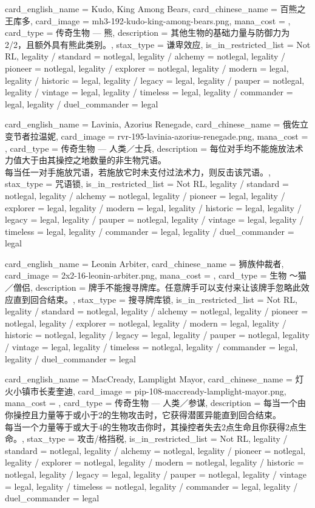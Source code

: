 \documentclass[lang = cn, color = black, 10pt]{AllThatStax}
\begin{document}
\card
{
	card_english_name = {Kudo, King Among Bears},
	card_chinese_name = {百熊之王库多},
	card_image = mh3-192-kudo-king-among-bears.png,
	mana_cost = ,
	card_type = 传奇生物 — 熊,
	description = {其他生物的基础力量与防御力为2/2，且额外具有熊此类别。},
	stax_type = 谦卑效应,
	is_in_restricted_list = Not RL,
	legality / standard = notlegal,
	legality / alchemy = notlegal,
	legality / pioneer = notlegal,
	legality / explorer = notlegal,
	legality / modern = legal,
	legality / historic = legal,
	legality / legacy = legal,
	legality / pauper = notlegal,
	legality / vintage = legal,
	legality / timeless = legal,
	legality / commander = legal,
	legality / duel_commander = legal
}

\card
{
	card_english_name = {Lavinia, Azorius Renegade},
	card_chinese_name = {俄佐立变节者拉温妮},
	card_image = rvr-195-lavinia-azorius-renegade.png,
	mana_cost = ,
	card_type = 传奇生物 — 人类／士兵,
	description = {每位对手均不能施放法术力值大于由其操控之地数量的非生物咒语。\\
		每当任一对手施放咒语，若施放它时未支付过法术力，则反击该咒语。},
	stax_type = 咒语锁,
	is_in_restricted_list = Not RL,
	legality / standard = notlegal,
	legality / alchemy = notlegal,
	legality / pioneer = legal,
	legality / explorer = legal,
	legality / modern = legal,
	legality / historic = legal,
	legality / legacy = legal,
	legality / pauper = notlegal,
	legality / vintage = legal,
	legality / timeless = legal,
	legality / commander = legal,
	legality / duel_commander = legal
}

\card
{
	card_english_name = {Leonin Arbiter},
	card_chinese_name = {狮族仲裁者},
	card_image = 2x2-16-leonin-arbiter.png,
	mana_cost = ,
	card_type = 生物 ～猫／僧侣,
	description = {牌手不能搜寻牌库。任意牌手可以支付来让该牌手忽略此效应直到回合结束。},
	stax_type = 搜寻牌库锁,
	is_in_restricted_list = Not RL,
	legality / standard = notlegal,
	legality / alchemy = notlegal,
	legality / pioneer = notlegal,
	legality / explorer = notlegal,
	legality / modern = legal,
	legality / historic = notlegal,
	legality / legacy = legal,
	legality / pauper = notlegal,
	legality / vintage = legal,
	legality / timeless = notlegal,
	legality / commander = legal,
	legality / duel_commander = legal
}

\card
{
	card_english_name = {MacCready, Lamplight Mayor},
	card_chinese_name = {灯火小镇市长麦奎迪},
	card_image = pip-108-maccready-lamplight-mayor.png,
	mana_cost = ,
	card_type = 传奇生物 — 人类／参谋,
	description = {每当一个由你操控且力量等于或小于2的生物攻击时，它获得潜匿异能直到回合结束。\\
		每当一个力量等于或大于4的生物攻击你时，其操控者失去2点生命且你获得2点生命。},
	stax_type = 攻击/格挡税,
	is_in_restricted_list = Not RL,
	legality / standard = notlegal,
	legality / alchemy = notlegal,
	legality / pioneer = notlegal,
	legality / explorer = notlegal,
	legality / modern = notlegal,
	legality / historic = notlegal,
	legality / legacy = legal,
	legality / pauper = notlegal,
	legality / vintage = legal,
	legality / timeless = notlegal,
	legality / commander = legal,
	legality / duel_commander = legal
}
\end{document}
